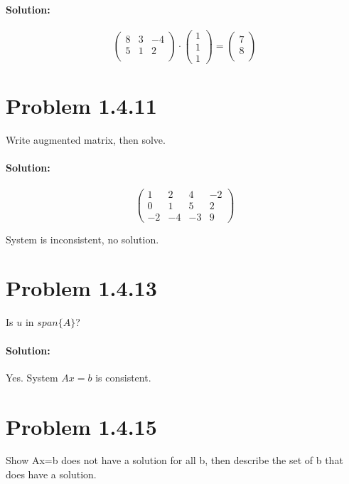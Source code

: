 \documentclass[11pt, notitlepage]{report}
\newenvironment{solution}{\paragraph{Solution:}}{\hfill}
\begin{document}
\begin{solution}

\[\left(\begin{matrix}{}
  8&3&-4 \\
  5&1&2 \\
\end{matrix}\right)
\cdot
\left(\begin{matrix}{}
  1\\
  1\\
  1
\end{matrix}\right)
=
\left(\begin{matrix}{}
  7\\
  8\\
\end{matrix}\right)
\]

\end{solution}

\section{Problem 1.4.11}

Write augmented matrix, then solve.

\begin{solution}

\[\left(\begin{matrix}{}
  1&  2 &4 &-2 \\
  0&  1 &5 &2\\
  -2&-4 &-3 &9
\end{matrix}\right)
\]

System is inconsistent, no solution.

\end{solution}

\newpage
\section{Problem 1.4.13}

Is $u$ in $span\{A\}$?

\begin{solution} Yes. System $Ax=b$ is consistent.
\end{solution}

\section{Problem 1.4.15}

Show Ax=b does not have a solution for all b, then describe the set of b that does have a solution.
\end{document}
